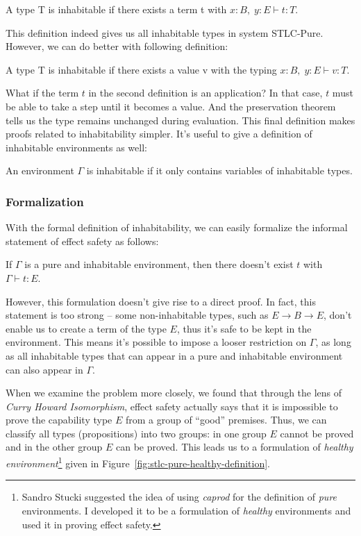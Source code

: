 \begin{definition}
  A type T is inhabitable if there exists a term t with
  $x:B,\; y:E \vdash t : T$.
\end{definition}

This definition indeed gives us all inhabitable types in system
STLC-Pure. However, we can do better with following definition:

\begin{definition}
  A type T is inhabitable if there exists a value v with the typing
  $x:B,\; y:E \vdash v : T$.
\end{definition}

What if the term $t$ in the second definition is an application? In
that case, $t$ must be able to take a step until it becomes a
value. And the preservation theorem tells us the type remains
unchanged during evaluation. This final definition makes proofs
related to inhabitability simpler. It's useful to give a definition of
inhabitable environments as well:

\begin{definition}
  An environment $\Gamma$ is inhabitable if it only contains variables
  of inhabitable types.
\end{definition}

\subsubsection{Formalization}

With the formal definition of inhabitability, we can easily formalize
the informal statement of effect safety as follows:

\begin{definition}
  If $\Gamma$ is a pure and inhabitable environment, then there
  doesn't exist $t$ with $\Gamma \vdash t : E$.
\end{definition}

However, this formulation doesn't give rise to a direct proof. In
fact, this statement is too strong -- some non-inhabitable types, such
as $E \to B \to E$, don't enable us to create a term of the type $E$,
thus it's safe to be kept in the environment. This means it's possible
to impose a looser restriction on $\Gamma$, as long as all inhabitable
types that can appear in a pure and inhabitable environment can also
appear in $\Gamma$.

When we examine the problem more closely, we found that through the
lens of \emph{Curry Howard Isomorphism}, effect safety actually says
that it is impossible to prove the capability type $E$ from a group of
``good'' premises. Thus, we can classify all types (propositions) into
two groups: in one group $E$ cannot be proved and in the other group
$E$ can be proved. This leads us to a formulation of \emph{healthy
  environment}\footnote{Sandro Stucki suggested the idea of using
  \emph{caprod} for the definition of \emph{pure} environments. I
  developed it to be a formulation of \emph{healthy} environments and
  used it in proving effect safety.} given in
Figure~\ref{fig:stlc-pure-healthy-definition}.

